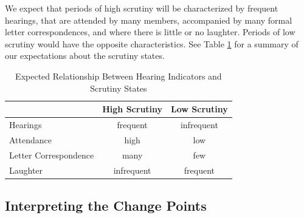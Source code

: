 \documentclass[a4paper]{article}\usepackage[]{graphicx}\usepackage[]{color}
\begin{document}
We expect that periods of high scrutiny will be characterized by frequent hearings, that are attended by many members, accompanied by many formal letter correspondences, and where there is little or no laughter. Periods of low scrutiny would have the opposite characteristics. See Table \ref{ExpectedTable} for a summary of our expectations about the scrutiny states.

\begin{table}
    \caption{Expected Relationship Between Hearing Indicators and Scrutiny States}
    \label{ExpectedTable}
    \begin{center}
        \begin{tabular}{l | c c}
            \hline
            & High Scrutiny & Low Scrutiny \\
            \hline \hline
            Hearings & frequent & infrequent \\[0.25cm]
            Attendance & high & low \\[0.25cm]
            Letter Correspondence & many & few \\[0.25cm]
            Laughter & infrequent & frequent \\
            \hline
        \end{tabular}
    \end{center}
\end{table}

\subsection{Interpreting the Change Points}
\end{document}
